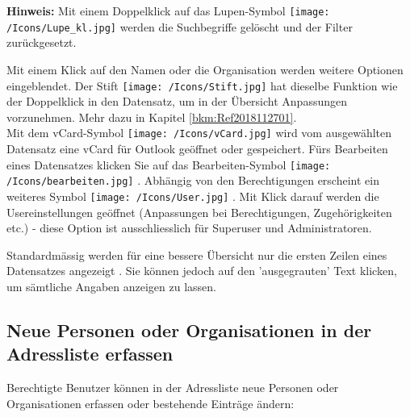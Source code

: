 \vspace{\baselineskip}

\textbf{Hinweis:} Mit einem Doppelklick auf das Lupen-Symbol \texttt{[image: /Icons/Lupe\_kl.jpg]}  werden die Suchbegriffe gelöscht und der Filter zurückgesetzt.

\vspace{\baselineskip}

Mit einem Klick auf den Namen  oder die Organisation werden weitere Optionen eingeblendet. Der Stift \texttt{[image: /Icons/Stift.jpg]}  hat dieselbe Funktion wie der Doppelklick in den Datensatz, um in der Übersicht Anpassungen vorzunehmen. Mehr dazu in Kapitel \ref{bkm:Ref2018112701}.\\
Mit dem vCard-Symbol \texttt{[image: /Icons/vCard.jpg]}  wird vom ausgewählten Datensatz eine vCard für Outlook geöffnet oder gespeichert. Fürs Bearbeiten eines Datensatzes klicken Sie auf das Bearbeiten-Symbol \texttt{[image: /Icons/bearbeiten.jpg]} . Abhängig von den Berechtigungen erscheint ein weiteres Symbol \texttt{[image: /Icons/User.jpg]} . Mit Klick darauf werden die Usereinstellungen geöffnet (Anpassungen bei Berechtigungen, Zugehörigkeiten etc.) - diese Option ist ausschliesslich für Superuser und Administratoren.

\vspace{\baselineskip}

Standardmässig werden für eine bessere Übersicht nur die ersten Zeilen eines Datensatzes angezeigt . Sie können jedoch auf den 'ausgegrauten' Text klicken, um sämtliche Angaben anzeigen zu lassen.

\clearpage
\subsection{Neue Personen oder Organisationen in der Adressliste erfassen}
\label{bkm:Ref2018071901}
Berechtigte Benutzer können in der Adressliste neue Personen oder Organisationen erfassen oder bestehende Einträge ändern:

\vspace{\baselineskip}


